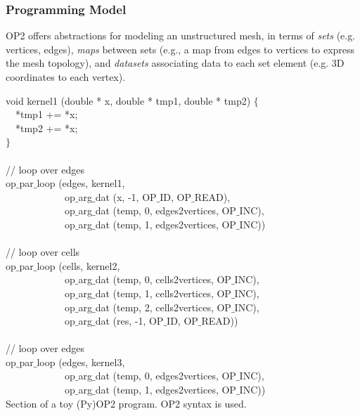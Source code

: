 \subsubsection{Programming Model}

OP2 offers abstractions for modeling an unstructured mesh, in terms of {\em sets} (e.g. vertices, edges), {\em maps} between sets (e.g., a map from edges to vertices to express the mesh topology), and {\em datasets} associating data to each set element (e.g. 3D coordinates to each vertex).

\begin{algorithm}[t]
\scriptsize\ttfamily
{}

void kernel1 (double * x, double * tmp1, double * tmp2) $\lbrace$\\
~~*tmp1 += *x;\\
~~*tmp2 += *x;\\
$\rbrace$~\\
~\\
// loop over edges\\
op$\_$par$\_$loop (edges, kernel1,\\
~~~~~~~~~~~~op$\_$arg$\_$dat (x, -1, OP$\_$ID, OP$\_$READ),\\
~~~~~~~~~~~~op$\_$arg$\_$dat (temp, 0, edges2vertices, OP$\_$INC),\\
~~~~~~~~~~~~op$\_$arg$\_$dat (temp, 1, edges2vertices, OP$\_$INC))\\
~\\
// loop over cells\\
op$\_$par$\_$loop (cells, kernel2,\\
~~~~~~~~~~~~op$\_$arg$\_$dat (temp, 0, cells2vertices, OP$\_$INC),\\
~~~~~~~~~~~~op$\_$arg$\_$dat (temp, 1, cells2vertices, OP$\_$INC),\\
~~~~~~~~~~~~op$\_$arg$\_$dat (temp, 2, cells2vertices, OP$\_$INC),\\
~~~~~~~~~~~~op$\_$arg$\_$dat (res, -1, OP$\_$ID, OP$\_$READ))\\
~\\
// loop over edges\\
op$\_$par$\_$loop (edges, kernel3,\\
~~~~~~~~~~~~op$\_$arg$\_$dat (temp, 0, edges2vertices, OP$\_$INC),\\
~~~~~~~~~~~~op$\_$arg$\_$dat (temp, 1, edges2vertices, OP$\_$INC))\\

\caption{Section of a toy (Py)OP2 program. OP2 syntax is used.}
\label{code:op2program}
\end{algorithm}

